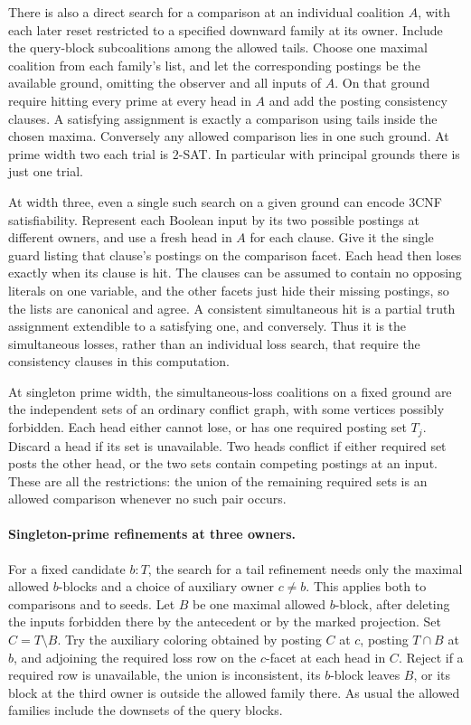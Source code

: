 There is also a direct search for a comparison
at an individual coalition $A$, with each later
reset restricted to a specified downward family
at its owner. Include the query-block subcoalitions
among the allowed tails. Choose one maximal
coalition from each family's list, and let
the corresponding postings be the available
ground, omitting the observer and all inputs of
$A$. On that ground require hitting every prime
at every head in $A$ and add the posting
consistency clauses. A satisfying assignment
is exactly a comparison using tails inside
the chosen maxima. Conversely any allowed
comparison lies in one such ground. At prime
width two each trial is $2$-SAT. In particular
with principal grounds there is just one trial.

At width three, even a single such search on
a given ground can encode 3CNF satisfiability.
Represent each Boolean input by its two
possible postings at different owners, and
use a fresh head in $A$ for each clause.
Give it the single guard listing that
clause's postings on the comparison facet.
Each head then loses exactly when its clause
is hit. The clauses can be assumed to contain
no opposing literals on one variable, and
the other facets just hide their missing
postings, so the lists are canonical and
agree. A consistent simultaneous hit is a
partial truth assignment extendible to a
satisfying one, and conversely. Thus it is
the simultaneous losses, rather than an
individual loss search, that require the
consistency clauses in this computation.

At singleton prime width, the simultaneous-loss
coalitions on a fixed ground are the independent
sets of an ordinary conflict graph, with some
vertices possibly forbidden. Each head either
cannot lose, or has one required posting set
$T_j$. Discard a head if its set is unavailable.
Two heads conflict if either required set posts
the other head, or the two sets contain competing
postings at an input. These are all the
restrictions: the union of the remaining required
sets is an allowed comparison whenever no such
pair occurs.

\paragraph{Singleton-prime refinements at three owners.}
For a fixed candidate $b:T$, the search for a tail
refinement needs only the maximal allowed $b$-blocks
and a choice of auxiliary owner $c\ne b$. This applies
both to comparisons and to seeds. Let $B$ be one
maximal allowed $b$-block, after deleting the inputs
forbidden there by the antecedent or by the marked
projection. Set $C=T\setminus B$. Try the auxiliary
coloring obtained by posting $C$ at $c$, posting
$T\cap B$ at $b$, and adjoining the required loss
row on the $c$-facet at each head in $C$. Reject if
a required row is unavailable, the union is
inconsistent, its $b$-block leaves $B$, or its block
at the third owner is outside the allowed family there.
As usual the allowed families include the downsets of
the query blocks.

